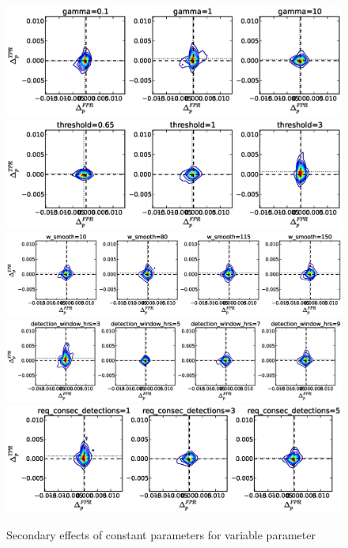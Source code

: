 \begin{figure}[!h]
\begin{center}
\includegraphics[width=6in]{../fig/final/delta_hist_sec/cmpr_window/gamma}
\includegraphics[width=6in]{../fig/final/delta_hist_sec/cmpr_window/threshold}
\includegraphics[width=6in]{../fig/final/delta_hist_sec/cmpr_window/w_smooth}
\includegraphics[width=6in]{../fig/final/delta_hist_sec/cmpr_window/detection_window_hrs}
\includegraphics[width=6in]{../fig/final/delta_hist_sec/cmpr_window/req_consec_detections}
\end{center}
\caption{\label{fig:delta_sec2} Secondary effects of constant parameters for variable parameter }
\end{figure}

